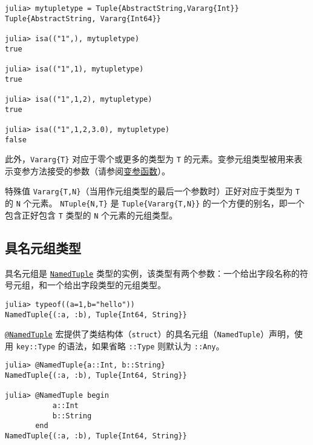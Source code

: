 \begin{verbatim}
julia> mytupletype = Tuple{AbstractString,Vararg{Int}}
Tuple{AbstractString, Vararg{Int64}}

julia> isa(("1",), mytupletype)
true

julia> isa(("1",1), mytupletype)
true

julia> isa(("1",1,2), mytupletype)
true

julia> isa(("1",1,2,3.0), mytupletype)
false
\end{verbatim}



此外，\texttt{Vararg\{T\}} 对应于零个或更多的类型为 \texttt{T} 的元素。变参元组类型被用来表示变参方法接受的参数（请参阅\hyperlink{9965084594348935329}{变参函数}）。  



特殊值 \texttt{Vararg\{T,N\}}（当用作元组类型的最后一个参数时）正好对应于类型为 \texttt{T} 的 \texttt{N} 个元素。 \texttt{NTuple\{N,T\}} 是 \texttt{Tuple\{Vararg\{T,N\}\}} 的一个方便的别名，即一个包含正好包含 \texttt{T} 类型的 \texttt{N} 个元素的元组类型。



\hypertarget{6997324644254770141}{}


\subsection{具名元组类型}



具名元组是 \hyperlink{3845731488275720657}{\texttt{NamedTuple}} 类型的实例，该类型有两个参数：一个给出字段名称的符号元组，和一个给出字段类型的元组类型。




\begin{verbatim}
julia> typeof((a=1,b="hello"))
NamedTuple{(:a, :b), Tuple{Int64, String}}
\end{verbatim}



\hyperlink{6227584413761290041}{\texttt{@NamedTuple}} 宏提供了类结构体（\texttt{struct}）的具名元组（\texttt{NamedTuple}）声明，使用 \texttt{key::Type} 的语法，如果省略 \texttt{::Type} 则默认为 \texttt{::Any}。




\begin{verbatim}
julia> @NamedTuple{a::Int, b::String}
NamedTuple{(:a, :b), Tuple{Int64, String}}

julia> @NamedTuple begin
           a::Int
           b::String
       end
NamedTuple{(:a, :b), Tuple{Int64, String}}
\end{verbatim}



